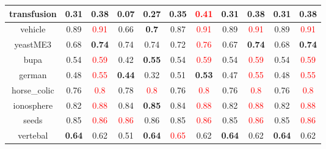 \documentclass{article}%
\begin{document}
\begin{tabular}{c|cccccccccc}
\hline%
transfusion&0.31&\textbf{0.38}&0.07&\textbf{0.27}&0.35&\textcolor{red}{ 
0.41
}&0.31&\textbf{0.38}&0.31&\textbf{0.38}\\%
\hline%
vehicle&0.89&\textcolor{red}{ 
0.91
}&0.66&\textbf{0.7}&0.87&\textcolor{red}{ 
0.91
}&0.89&\textcolor{red}{ 
0.91
}&0.89&\textcolor{red}{ 
0.91
}\\%
\hline%
yeastME3&0.68&\textbf{0.74}&0.74&0.74&0.72&\textcolor{red}{ 
0.76
}&0.67&\textbf{0.74}&0.68&\textbf{0.74}\\%
\hline%
bupa&0.54&\textcolor{red}{ 
0.59
}&0.42&\textbf{0.55}&0.54&\textcolor{red}{ 
0.59
}&0.54&\textcolor{red}{ 
0.59
}&0.54&\textcolor{red}{ 
0.59
}\\%
\hline%
german&0.48&\textcolor{red}{ 
0.55
}&\textbf{0.44}&0.32&0.51&\textbf{0.53}&0.47&\textcolor{red}{ 
0.55
}&0.48&\textcolor{red}{ 
0.55
}\\%
\hline%
horse\_colic&0.76&\textcolor{red}{ 
0.8
}&0.78&\textcolor{red}{ 
0.8
}&0.76&\textcolor{red}{ 
0.8
}&0.76&\textcolor{red}{ 
0.8
}&0.76&\textcolor{red}{ 
0.8
}\\%
\hline%
ionosphere&0.82&\textcolor{red}{ 
0.88
}&0.84&\textbf{0.85}&0.84&\textcolor{red}{ 
0.88
}&0.82&\textcolor{red}{ 
0.88
}&0.82&\textcolor{red}{ 
0.88
}\\%
\hline%
seeds&0.85&\textcolor{red}{ 
0.86
}&\textcolor{red}{ 
0.86
}&0.86&0.85&\textcolor{red}{ 
0.86
}&0.85&\textcolor{red}{ 
0.86
}&0.85&\textcolor{red}{ 
0.86
}\\%
\hline%
vertebal&\textbf{0.64}&0.62&0.51&\textbf{0.64}&\textcolor{red}{ 
0.65
}&0.62&\textbf{0.64}&0.62&\textbf{0.64}&0.62\\%
\hline%
\end{tabular}

%
\end{document}
